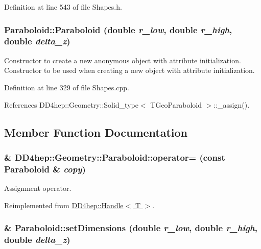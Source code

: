 Definition at line 543 of file Shapes.h.\hypertarget{class_d_d4hep_1_1_geometry_1_1_paraboloid_a5819ff6e96e1969a6e342d53e4bdc09c}{
\subsubsection[{Paraboloid}]{\setlength{\rightskip}{0pt plus 5cm}Paraboloid::Paraboloid (double {\em r\_\-low}, \/  double {\em r\_\-high}, \/  double {\em delta\_\-z})}}
\label{class_d_d4hep_1_1_geometry_1_1_paraboloid_a5819ff6e96e1969a6e342d53e4bdc09c}


Constructor to create a new anonymous object with attribute initialization. Constructor to be used when creating a new object with attribute initialization. 

Definition at line 329 of file Shapes.cpp.

References DD4hep::Geometry::Solid\_\-type$<$ TGeoParaboloid $>$::\_\-assign().

\subsection{Member Function Documentation}
\hypertarget{class_d_d4hep_1_1_geometry_1_1_paraboloid_ad6b240ee1db323b5a8f69c292632d011}{
\subsubsection[{operator=}]{\& DD4hep::Geometry::Paraboloid::operator= (const {\bf Paraboloid} \& {\em copy})}}
\label{class_d_d4hep_1_1_geometry_1_1_paraboloid_ad6b240ee1db323b5a8f69c292632d011}


Assignment operator. 

Reimplemented from \hyperlink{class_d_d4hep_1_1_handle_a9bbf8f498df42e81ad26fb00233505a6}{DD4hep::Handle$<$ T $>$}.\hypertarget{class_d_d4hep_1_1_geometry_1_1_paraboloid_ac05a503afc384dfc0fc882465e9e43df}{
\subsubsection[{setDimensions}]{ \& Paraboloid::setDimensions (double {\em r\_\-low}, \/  double {\em r\_\-high}, \/  double {\em delta\_\-z})}}
\label{class_d_d4hep_1_1_geometry_1_1_paraboloid_ac05a503afc384dfc0fc882465e9e43df}


